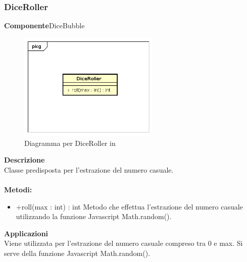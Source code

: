 \clearpage

\subsubsection{DiceRoller}
\textbf{Componente}DiceBubble\\
   \FloatBarrier
   \begin{figure}[ht]
   \centering
   \includegraphics[width=0.6\textwidth]{img/single-DiceRoller}
   \caption{{Diagramma per DiceRoller in }}
\end{figure}
\FloatBarrier
\textbf{Descrizione}\\
Classe predisposta per l'estrazione del numero casuale.
\\
\\
\textbf{Metodi:} 
\begin{itemize}
\item +roll(max : int) : int
Metodo che effettua l'estrazione del numero casuale utilizzando la funzione Javascript Math.random().
\end{itemize} 


\textbf{Applicazioni}\\
Viene utilizzata per l'estrazione del numero casuale compreso tra 0 e max. Si serve della funzione Javascript Math.random(). 


\clearpage

